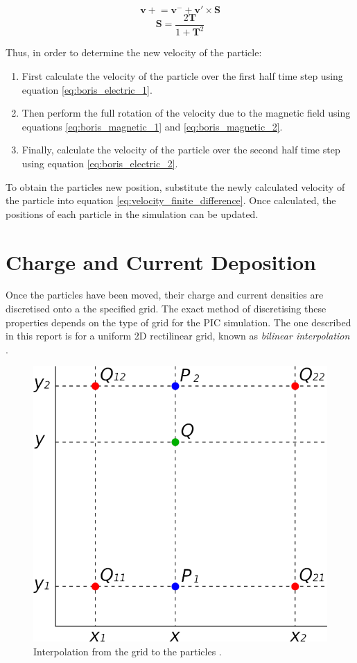 \begin{equation}
	\bm{v+} = \bm{v^-} + \bm{v'} \times \bm{S}
	\label{eq:boris_magnetic_2}
\end{equation}
\begin{equation}
	\bm{S} = \frac{2\bm{T}}{1 + \bm{T}^2}
	\label{eq:vector_S}
\end{equation}

Thus, in order to determine the new velocity of the particle:

\begin{enumerate}
	\item First calculate the velocity of the particle over the first half time step using equation \ref{eq:boris_electric_1}.
	\item Then perform the full rotation of the velocity due to the magnetic field using equations \ref{eq:boris_magnetic_1} and \ref{eq:boris_magnetic_2}.
	\item Finally, calculate the velocity of the particle over the second half time step using equation \ref{eq:boris_electric_2}.
\end{enumerate}

To obtain the particles new position, substitute the newly calculated velocity of the particle into equation \ref{eq:velocity_finite_difference}. Once calculated, the positions of each particle in the simulation can be updated.


\section{Charge and Current Deposition}

Once the particles have been moved, their charge and current densities are discretised onto a the specified grid. The exact method of discretising these properties depends on the type of grid for the PIC simulation. The one described in this report is for a uniform 2D rectilinear grid, known as  \textit{bilinear interpolation} \cite{Press1988C3}. 

\begin{figure}[h!]
	\centering
	\includegraphics[width=0.55\linewidth]{particle_in_cell/figures/bilinear_interpotation_to_particle.png}
	\caption{Interpolation from the grid to the particles \cite{Ha2019}.}
	\label{fig:bilinear_interpotation_to_particle}
\end{figure} 

